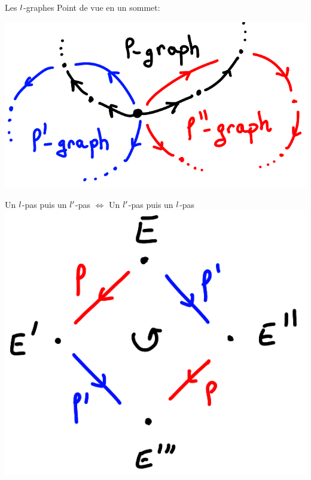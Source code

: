 \documentclass{beamer}
\begin{document}
\begin{frame}{Les $\mathnormal{l}$-graphes}
	Point de vue en un sommet:
	\begin{center}
		\includegraphics[scale=0.2]{../figs/graphs}
	\end{center}
	\begin{center}
	Un $\mathnormal{l}$-pas puis un $\mathnormal{l}'$-pas $\iff$ Un $\mathnormal{l}'$-pas puis un $\mathnormal{l}$-pas
		\includegraphics[scale=0.2]{../figs/comm}
	\end{center}
\end{frame}
\end{document}
